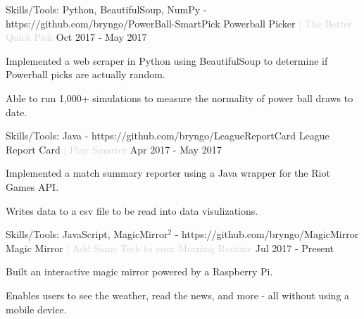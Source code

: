 

\begin{cventries}

  \cventry
    {Skills/Tools: Python, BeautifulSoup, NumPy - https://github.com/bryngo/PowerBall-SmartPick} %
    {Powerball Picker \textcolor{lightgray}{| The Better Quick Pick}} %
    {} %
    {Oct 2017 - May 2017} %
    {
      \begin{cvitems} %
        \item {Implemented a web scraper in Python using BeautifulSoup to determine if Powerball picks are actually random.}
        \item {Able to run 1,000+ simulations to measure the normality of power ball draws to date.}
      \end{cvitems}
    }

  \cventry
    {Skills/Tools: Java - https://github.com/bryngo/LeagueReportCard} %
    {League Report Card \textcolor{lightgray}{| Play Smarter}} %
    {} %
    {Apr 2017 - May 2017} %
    {
      \begin{cvitems} %
        \item {Implemented a match summary reporter using a Java wrapper for the Riot Games API.}
        \item {Writes data to a csv file to be read into data visulizations.}
      \end{cvitems}
    }

    \cventry
      {Skills/Tools: JavaScript, MagicMirror$^2$ - https://github.com/bryngo/MagicMirror} %
      {Magic Mirror \textcolor{lightgray}{| Add Some Tech to your Morning Routine}} %
      {} %
      {Jul 2017 - Present} %
      {
        \begin{cvitems} %
          \item {Built an interactive magic mirror powered by a Raspberry Pi.}
          \item {Enables users to see the weather, read the news, and more - all without using a mobile device.}
        \end{cvitems}
      }

\end{cventries}
